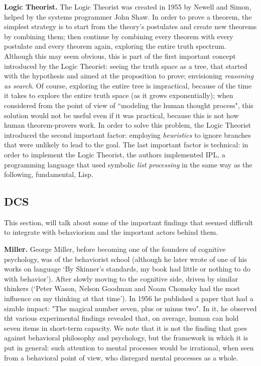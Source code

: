 \documentclass[../main.tex]{subfiles}
\begin{document}
\vspace{4pt}
\textbf{Logic Theorist.}
The Logic Theorist was created in 1955 by Newell and Simon, helped by the systems programmer John Shaw. In order to prove a theorem, the simplest strategy is to start from the theory's postulates and create new theorems by combining them; then continue by combining every theorem with every postulate and every theorem again, exploring the entire truth spectrum. Although this may seem obvious, this is part of the first important concept introduced by the Logic Theorist: seeing the truth space as a tree, that started with the hypothesis and aimed at the proposition to prove; envisioning \textit{reasoning as search}. Of course, exploring the entire tree is impractical, because of the time it takes to explore the entire truth space (as it grows exponentially); when considered from the point of view of ``modeling the human thought process", this solution would not be useful even if it was practical, because this is not how human theorem-provers work. In order to solve this problem, the Logic Theorist introduced the second important factor: employing \textit{heuristics} to ignore branches that were unlikely to lead to the goal. The last important factor is technical: in order to implement the Logic Theorist, the authors implemented IPL, a programming language that used symbolic \textit{list processing} in the same way as the following, fundamental, Lisp.

\subsection{DCS}
This section, will talk about some of the important findings that seemed difficult to integrate with behaviorism and the important actors behind them.

\vspace{4pt}
\textbf{Miller.}
George Miller, before becoming one of the founders of cognitive psychology, was of the behaviorist school (although he later wrote of one of his works on language \enquote*{By Skinner’s standards, my book had little or nothing to do with behavior}\cite{millerCognitiveRevolutionHistorical2003}). After slowly moving to the cognitive side, driven by similar thinkers (\enquote*{Peter Wason, Nelson Goodman and Noam Chomsky had the most influence on my thinking at that time}). In 1956 he published a paper that had a sizable impact: "The magical number seven, plus or minus two". In it, he observed tht various experimental findings revealed that, on average, human can hold seven items in short-term capacity. We note that it is not the finding that goes against behavioral philosophy and psychology, but the framework in which it is put in general: such attention to mental processes would be irrational, when seen from a behavioral point of view, who disregard mental processes as a whole.
\end{document}
